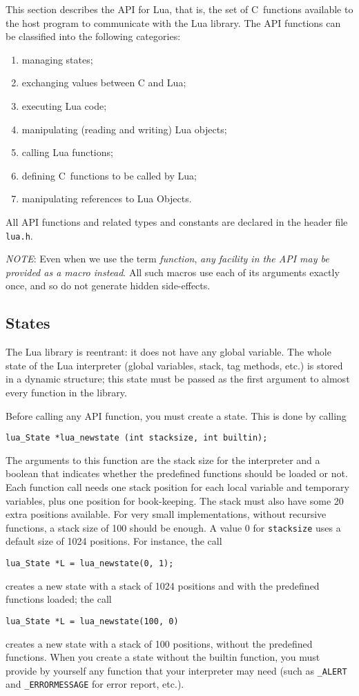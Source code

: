 \documentclass[11pt]{article}
\newcommand{\Deffunc}[1]{\index{#1}}
\newcommand{\NOTE}{\par\noindent\emph{NOTE}: }
\begin{document}
This section describes the API for Lua, that is,
the set of C~functions available to the host program to communicate
with the Lua library.
The API functions can be classified into the following categories:
\begin{enumerate}
\item managing states;
\item exchanging values between C and Lua;
\item executing Lua code;
\item manipulating (reading and writing) Lua objects;
\item calling Lua functions;
\item defining C~functions to be called by Lua;
\item manipulating references to Lua Objects.
\end{enumerate}
All API functions and related types and constants
are declared in the header file \verb|lua.h|.

\NOTE
Even when we use the term \emph{function},
\emph{any facility in the API may be provided as a macro instead}.
All such macros use each of its arguments exactly once,
and so do not generate hidden side-effects.


\subsection{States} \label{mangstate}

The Lua library is reentrant:
it does not have any global variable.
The whole state of the Lua interpreter
(global variables, stack, tag methods, etc.)
is stored in a dynamic structure; \Deffunc{lua_State}
this state must be passed as the first argument to almost
every function in the library.

Before calling any API function,
you must create a state.
This is done by calling\Deffunc{lua_newstate}
\begin{verbatim}
lua_State *lua_newstate (int stacksize, int builtin);
\end{verbatim}
The arguments to this function are
the stack size for the interpreter and a boolean that
indicates whether the predefined functions should be loaded or not.
Each function call needs one stack position for each local variable
and temporary variables, plus one position for book-keeping.
The stack must also have some 20 extra positions available.
For very small implementations, without recursive functions,
a stack size of 100 should be enough.
A value 0 for \verb|stacksize| uses a default size of 1024 positions.
For instance, the call
\begin{verbatim}
lua_State *L = lua_newstate(0, 1);
\end{verbatim}
creates a new state with a stack of 1024 positions
and with the predefined functions loaded;
the call
\begin{verbatim}
lua_State *L = lua_newstate(100, 0)
\end{verbatim}
creates a new state with a stack of 100 positions,
without the predefined functions.
When you create a state without the builtin function,
you must provide by yourself any function that your interpreter may need
(such as \verb|_ALERT| and \verb|_ERRORMESSAGE| for error report, etc.).
\end{document}
